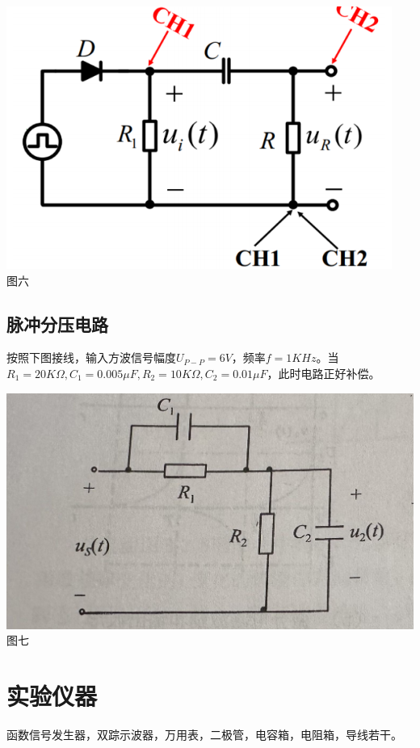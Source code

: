 \documentclass[a4paper]{article}
\begin{document}
    \begin{center}
        \includegraphics[scale=0.8]{6}\\
        {\small 图六}
    \end{center}

    \subsection{脉冲分压电路}
    {按照下图接线，输入方波信号幅度$U_{P-P}=6V$，频率$f=1KHz$。当$R_1=20K\Omega,C_1=0.005\mu F,R_2=10K\Omega,C_2=0.01\mu F$，此时电路正好补偿。}\label{subsec:}

    \begin{center}
        \includegraphics[scale=0.15]{15}\\
        {\small 图七}
    \end{center}

    \vspace{1cm}

    \section{实验仪器}
    {函数信号发生器，双踪示波器，万用表，二极管，电容箱，电阻箱，导线若干。}\label{sec:4}
\end{document}
